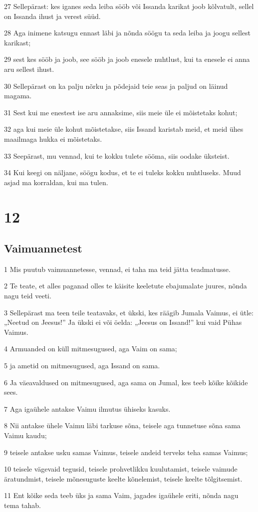 \par 27 Sellepärast: kes iganes seda leiba sööb või Issanda karikat joob kõlvatult, sellel on Issanda ihust ja verest süüd.
\par 28 Aga inimene katsugu ennast läbi ja nõnda söögu ta seda leiba ja joogu sellest karikast;
\par 29 sest kes sööb ja joob, see sööb ja joob enesele nuhtlust, kui ta enesele ei anna aru sellest ihust.
\par 30 Sellepärast on ka palju nõrku ja põdejaid teie seas ja paljud on läinud magama.
\par 31 Sest kui me enestest ise aru annaksime, siis meie üle ei mõistetaks kohut;
\par 32 aga kui meie üle kohut mõistetakse, siis Issand karistab meid, et meid ühes maailmaga hukka ei mõistetaks.
\par 33 Seepärast, mu vennad, kui te kokku tulete sööma, siis oodake üksteist.
\par 34 Kui keegi on näljane, söögu kodus, et te ei tuleks kokku nuhtluseks. Muud asjad ma korraldan, kui ma tulen.


\chapter{12}

\section*{Vaimuannetest}

\par 1 Mis puutub vaimuannetesse, vennad, ei taha ma teid jätta teadmatusse.
\par 2 Te teate, et alles paganad olles te käisite keeletute ebajumalate juures, nõnda nagu teid veeti.
\par 3 Sellepärast ma teen teile teatavaks, et ükski, kes räägib Jumala Vaimus, ei ütle: „Neetud on Jeesus!” Ja ükski ei või öelda: „Jeesus on Issand!” kui vaid Pühas Vaimus.
\par 4 Armuanded on küll mitmesugused, aga Vaim on sama;
\par 5 ja ametid on mitmesugused, aga Issand on sama.
\par 6 Ja väeavaldused on mitmesugused, aga sama on Jumal, kes teeb kõike kõikide sees.
\par 7 Aga igaühele antakse Vaimu ilmutus ühiseks kasuks.
\par 8 Nii antakse ühele Vaimu läbi tarkuse sõna, teisele aga tunnetuse sõna sama Vaimu kaudu;
\par 9 teisele antakse usku samas Vaimus, teisele andeid terveks teha samas Vaimus;
\par 10 teisele vägevaid tegusid, teisele prohvetlikku kuulutamist, teisele vaimude äratundmist, teisele mõnesuguste keelte kõnelemist, teisele keelte tõlgitsemist.
\par 11 Ent kõike seda teeb üks ja sama Vaim, jagades igaühele eriti, nõnda nagu tema tahab.

